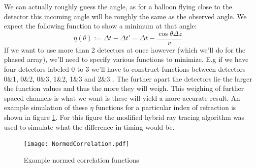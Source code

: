 We can actually roughly guess the angle, as for a balloon flying close to the
detector this incoming angle will be roughly the same as the observed angle.
We expect the following function to show a minimum at that angle:
\begin{equation}
	\eta(\theta) := \Delta t - \Delta t' = \Delta t
	- \frac{\cos\theta \Delta z}{v}
  \label{eqn:PlaneWave}
\end{equation}
If we want to use more than 2 detectors at once however (which we'll
do for the phased array), we'll need to specify various functions to
minimize.  E.g if we have four detectors labeled 0 to 3 we'll have
to construct functions between detectors 0\&1, 0\&2, 0\&3, 1\&2,
1\&3 and 2\&3 . The further apart the detectors lie the larger the
function values and thus the more they will weigh. This weighing of
further spaced channels is what we want is these will yield a more
accurate result.  An example simulation of these $\eta$ functions
for a particular index of refraction is shown in figure
\ref{fig:NormedCorrelation}.  For this figure the modified hybrid
ray tracing algorithm was used to simulate what the difference in
timing would be.
\begin{figure}
	\centering
	\texttt{[image: NormedCorrelation.pdf]}
	\caption{Example normed correlation functions}
	\label{fig:NormedCorrelation}
\end{figure}
